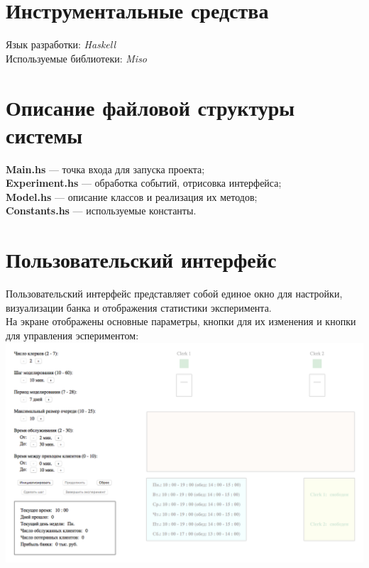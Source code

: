 \documentclass[oneside,final,12pt]{article}
\begin{document}
\section{Инструментальные средства}
Язык разработки: \textit{Haskell}\\

Используемые библиотеки: \textit{Miso}

\section{Описание файловой структуры системы}
\textbf{Main.hs} --- точка входа для запуска проекта;\\

\textbf{Experiment.hs} --- обработка событий, отрисовка интерфейса;\\

\textbf{Model.hs} --- описание классов и реализация их методов;\\

\textbf{Constants.hs} --- используемые константы.\\
\newpage
\section{Пользовательский интерфейс}
 
Пользовательский интерфейс представляет собой единое окно для настройки, визуализации банка и отображения статистики эксперимента.\\

На экране отображены основные параметры, кнопки для их изменения и кнопки для управления эспериментом:\\

 \includegraphics[width=150mm]{not_inited.png}\\
 
\end{document}
